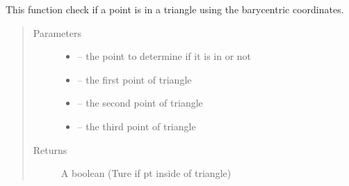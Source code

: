 \documentclass[letterpaper,10pt,english]{sphinxmanual}
\begin{document}
\begin{fulllineitems}
\label{\detokenize{index:src.mesh_grid2.inside_trigon}}
This function check if a point is in a triangle using the barycentric coordinates.
\begin{quote}\begin{description}
\item[{Parameters}] \leavevmode\begin{itemize}
\item {} 
 -- the point to determine if it is in or not

\item {} 
 -- the first point of triangle

\item {} 
 -- the second point of triangle

\item {} 
 -- the third point of triangle

\end{itemize}

\item[{Returns}] \leavevmode
A boolean (Ture if pt inside of triangle)

\end{description}\end{quote}

\end{fulllineitems}

\end{document}
